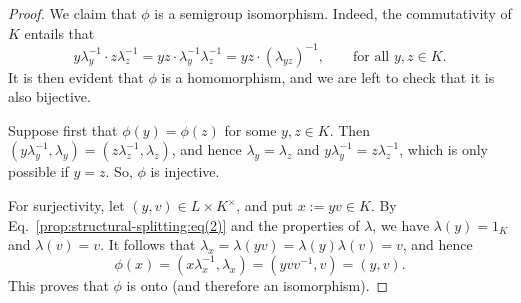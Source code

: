 \documentclass[10pt,a4paper]{amsart}
\begin{document}
\begin{proof}
We claim that $\phi$ is a semigroup isomorphism. Indeed, the commutativity of $K$ entails that
\[
y\lambda_y^{-1} \cdot z \lambda_z^{-1} = yz \cdot \lambda_y^{-1} \lambda_z^{-1} = yz \cdot (\lambda_{yz})^{-1},
\qquad\text{for all } y, z \in K.
\]
It is then evident that $\phi$ is a homomorphism, and we are left to check that it is also bijective.

Suppose first that $\phi(y) = \phi(z)$ for some $y, z \in K$. Then $(y\lambda_y^{-1}, \lambda_y) = 
(z\lambda_z^{-1}, \lambda_z)$, and hence $\lambda_y = \allowbreak \lambda_z$ and $y\lambda_y^{-1} = z\lambda_z^{-1}$, which is only possible if $y = z$. So, $\phi$ is injective.

For surjectivity, let $(y, v) \in L \times K^\times$, and put $x := yv \in K$. By Eq.~\eqref{prop:structural-splitting:eq(2)} and the properties of $\lambda$, 
we have $\lambda(y) = 1_K$ and $\lambda(v) = v$. It follows that $\lambda_x = \lambda(yv) = \lambda(y)\lambda(v) = v$, and hence
\[
\phi(x) = (x \lambda_x^{-1}, \lambda_x) = (yvv^{-1}, v) = (y, v).
\]
This proves that $\phi$ is onto (and therefore an isomorphism).
\end{proof}
\end{document}
